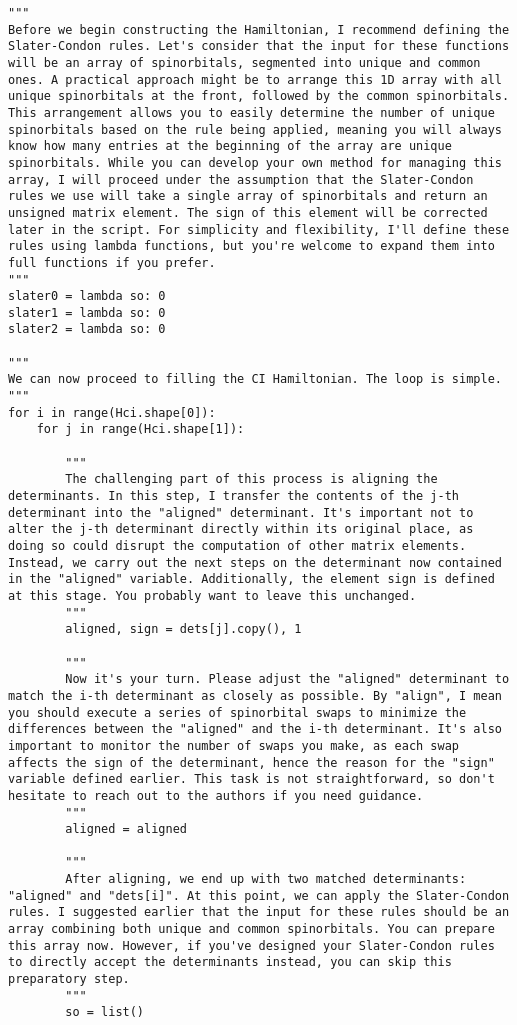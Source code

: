 \begin{lstlisting}
"""
Before we begin constructing the Hamiltonian, I recommend defining the Slater-Condon rules. Let's consider that the input for these functions will be an array of spinorbitals, segmented into unique and common ones. A practical approach might be to arrange this 1D array with all unique spinorbitals at the front, followed by the common spinorbitals. This arrangement allows you to easily determine the number of unique spinorbitals based on the rule being applied, meaning you will always know how many entries at the beginning of the array are unique spinorbitals. While you can develop your own method for managing this array, I will proceed under the assumption that the Slater-Condon rules we use will take a single array of spinorbitals and return an unsigned matrix element. The sign of this element will be corrected later in the script. For simplicity and flexibility, I'll define these rules using lambda functions, but you're welcome to expand them into full functions if you prefer.
"""
slater0 = lambda so: 0
slater1 = lambda so: 0
slater2 = lambda so: 0

"""
We can now proceed to filling the CI Hamiltonian. The loop is simple.
"""
for i in range(Hci.shape[0]):
    for j in range(Hci.shape[1]):

        """
        The challenging part of this process is aligning the determinants. In this step, I transfer the contents of the j-th determinant into the "aligned" determinant. It's important not to alter the j-th determinant directly within its original place, as doing so could disrupt the computation of other matrix elements. Instead, we carry out the next steps on the determinant now contained in the "aligned" variable. Additionally, the element sign is defined at this stage. You probably want to leave this unchanged.
        """
        aligned, sign = dets[j].copy(), 1

        """
        Now it's your turn. Please adjust the "aligned" determinant to match the i-th determinant as closely as possible. By "align", I mean you should execute a series of spinorbital swaps to minimize the differences between the "aligned" and the i-th determinant. It's also important to monitor the number of swaps you make, as each swap affects the sign of the determinant, hence the reason for the "sign" variable defined earlier. This task is not straightforward, so don't hesitate to reach out to the authors if you need guidance.
        """
        aligned = aligned

        """
        After aligning, we end up with two matched determinants: "aligned" and "dets[i]". At this point, we can apply the Slater-Condon rules. I suggested earlier that the input for these rules should be an array combining both unique and common spinorbitals. You can prepare this array now. However, if you've designed your Slater-Condon rules to directly accept the determinants instead, you can skip this preparatory step.
        """
        so = list()


\end{lstlisting}
